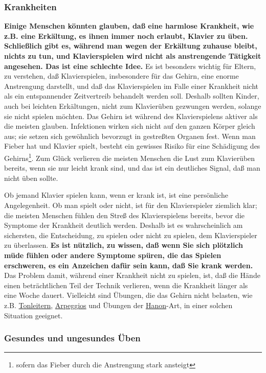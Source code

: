 \subsubsection{Krankheiten}
\label{c1iii10krank}

\textbf{Einige Menschen könnten glauben, daß eine harmlose Krankheit, wie z.B. eine Erkältung, es ihnen immer noch erlaubt, Klavier zu üben.
Schließlich gibt es, während man wegen der Erkältung zuhause bleibt, nichts zu tun, und Klavierspielen wird nicht als anstrengende Tätigkeit angesehen.
Das ist eine schlechte Idee.}
Es ist besonders wichtig für Eltern, zu verstehen, daß Klavierspielen, insbesondere für das Gehirn, eine enorme Anstrengung darstellt, und daß das Klavierspielen im Falle einer Krankheit nicht als ein entspannender Zeitvertreib behandelt werden soll.
Deshalb sollten Kinder, auch bei leichten Erkältungen, nicht zum Klavierüben gezwungen werden, solange sie nicht spielen möchten.
Das Gehirn ist während des Klavierspielens aktiver als die meisten glauben.
Infektionen wirken sich nicht auf den ganzen Körper gleich aus; sie setzen sich gewöhnlich bevorzugt in gestreßten Organen fest.
Wenn man Fieber hat und Klavier spielt, besteht ein gewisses Risiko für eine Schädigung des Gehirns\footnote{sofern das Fieber durch die Anstrengung stark ansteigt}.
Zum Glück verlieren die meisten Menschen die Lust zum Klavierüben bereits, wenn sie nur leicht krank sind, und das ist ein deutliches Signal, daß man nicht üben sollte.

Ob jemand Klavier spielen kann, wenn er krank ist, ist eine persönliche Angelegenheit.
Ob man spielt oder nicht, ist für den Klavierspieler ziemlich klar; die meisten Menschen fühlen den Streß des Klavierspielens bereits, bevor die Symptome der Krankheit deutlich werden.
Deshalb ist es wahrscheinlich am sichersten, die Entscheidung, zu spielen oder nicht zu spielen, dem Klavierspieler zu überlassen.
\textbf{Es ist nützlich, zu wissen, daß wenn Sie sich plötzlich müde fühlen oder andere Symptome spüren, die das Spielen erschweren, es ein Anzeichen dafür sein kann, daß Sie krank werden.}
Das Problem damit, während einer Krankheit nicht zu spielen, ist, daß die Hände einen beträchtlichen Teil der Technik verlieren, wenn die Krankheit länger als eine Woche dauert.
Vielleicht sind Übungen, die das Gehirn nicht belasten, wie z.B. \hyperref[c1iii5]{Tonleitern}, \hyperref[Arpeggios]{Arpeggios} und Übungen der \hyperref[c1iii7h]{Hanon}-Art, in einer solchen Situation geeignet.
 

\subsubsection{Gesundes und ungesundes Üben}
\label{c1iii10ungesund}


